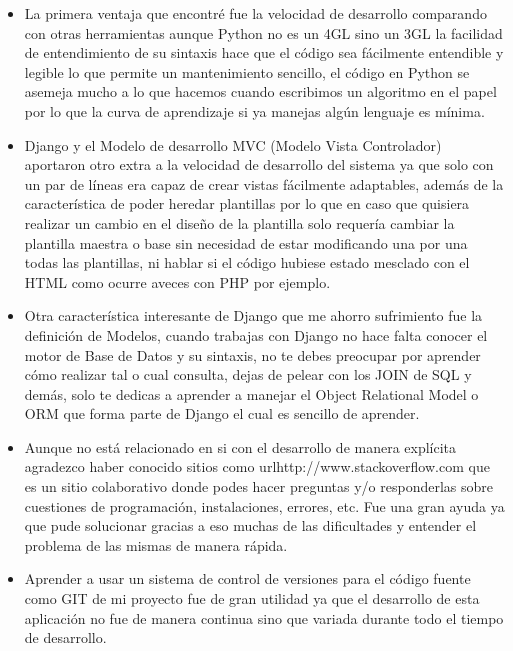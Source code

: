 \begin{itemize}
    \item La primera ventaja que encontré fue la velocidad de desarrollo comparando con otras herramientas aunque Python no es un 4GL sino un 3GL la facilidad de entendimiento de su sintaxis hace que el código
        sea fácilmente entendible y legible lo que permite un mantenimiento sencillo, el código en Python se asemeja mucho a lo que hacemos cuando escribimos un algoritmo en el papel por lo que la curva de aprendizaje si ya manejas algún lenguaje es mínima.

    \item Django y el Modelo de desarrollo MVC (Modelo Vista Controlador) aportaron otro extra a la velocidad de desarrollo del sistema ya que  solo con un par de líneas era capaz de crear vistas fácilmente adaptables, además de la característica de poder heredar plantillas por lo que en caso que quisiera realizar un cambio en el diseño de la plantilla solo requería cambiar la plantilla maestra o base sin necesidad de estar modificando una por una todas las plantillas, ni hablar si el código hubiese estado mesclado con el HTML como ocurre       aveces con PHP por ejemplo.

    \item Otra característica interesante de Django que me ahorro sufrimiento fue la definición de Modelos, cuando trabajas con Django no hace falta conocer el motor de Base de Datos y su sintaxis, no te debes preocupar por aprender cómo realizar tal o cual consulta, dejas de pelear con los JOIN de SQL y demás, solo te dedicas a aprender a manejar el Object Relational Model o ORM que forma parte de Django el cual es         sencillo de aprender.

    \item Aunque no está relacionado en si con el desarrollo de manera explícita agradezco haber conocido sitios como url{http://www.stackoverflow.com} que es un sitio colaborativo donde podes hacer preguntas y/o responderlas sobre cuestiones de programación, instalaciones, errores, etc. Fue una gran ayuda ya que pude solucionar gracias a eso muchas de las dificultades y entender el problema de las mismas de manera rápida.

    \item Aprender a usar un sistema de control de versiones para el código fuente como GIT de mi proyecto fue de gran utilidad ya que el desarrollo de esta aplicación no fue de manera continua sino que variada durante todo el tiempo de desarrollo.
\end{itemize}


